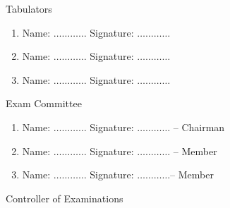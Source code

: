 \documentclass[11pt]{article}
\begin{document}
            \renewcommand{\arraystretch}{1.03}
            \vspace{-0.6 cm}




            \vspace*{1cm}


            
            \centering\begin{table}[hb]
            \begin{minipage}[b]{0.33\linewidth} %
            {\centering Tabulators }
            \begin{enumerate}
                \item Name: \hspace*{1ex} $\ldots \ldots \ldots \ldots$ Signature:  \hspace*{1ex} $\ldots \ldots \ldots \ldots$
                \item Name: \hspace*{1ex} $\ldots \ldots \ldots \ldots$ Signature:  \hspace*{1ex} $\ldots \ldots \ldots \ldots$
                \item Name: \hspace*{1ex} $\ldots \ldots \ldots \ldots$ Signature:  \hspace*{1ex} $\ldots \ldots \ldots \ldots$
            \end{enumerate} 

            \end{minipage}
            \hspace{2.3cm}
            \begin{minipage}[b]{0.33\linewidth}
            {\centering Exam Committee}
            \begin{enumerate}
            \item Name: \hspace*{1ex} $\ldots \ldots \ldots \ldots$  Signature:  \hspace*{1ex} $\ldots \ldots \ldots \ldots$ --  Chairman
            \item Name: \hspace*{1ex} $\ldots \ldots \ldots \ldots$  Signature:  \hspace*{1ex} $\ldots \ldots \ldots \ldots$ -- Member
            \item Name: \hspace*{1ex} $\ldots \ldots \ldots \ldots$  Signature:  \hspace*{1ex} $\ldots \ldots \ldots \ldots$-- Member
            \end{enumerate} 
            \end{minipage}
            \hspace*{1.2cm}
            \begin{minipage}[b]{0.19\linewidth} \centering
            Controller of Examinations  \hspace*{1ex}


\end{minipage}
\end{table}
\end{document}
